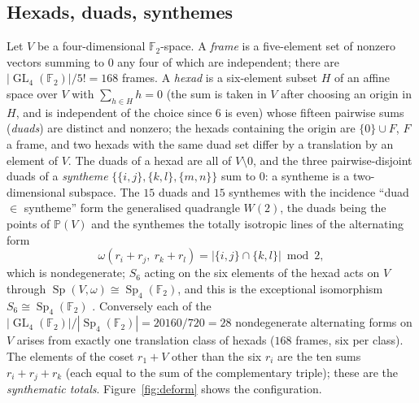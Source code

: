 ﻿\documentclass[12pt,a4paper]{amsart}
\theoremstyle{definition}
\newcommand{\F}{\mathbb{F}}
\newcommand{\Sp}{\operatorname{Sp}}
\newcommand{\GL}{\operatorname{GL}}
\begin{document}
\subsection{Hexads, duads, synthemes}\label{subsec:hexads}
Let $V$ be a four-dimensional $\F_2$-space. A \emph{frame} is a five-element set of nonzero vectors summing to $0$ any four of which are independent; there are $|\GL_4(\F_2)|/5!=168$ frames. A \emph{hexad} is a six-element subset $H$ of an affine space over $V$ with $\sum_{h\in H}h=0$ (the sum is taken in $V$ after choosing an origin in $H$, and is independent of the choice since $6$ is even) whose fifteen pairwise sums (\emph{duads}) are distinct and nonzero; the hexads containing the origin are $\{0\}\cup F$, $F$ a frame, and two hexads with the same duad set differ by a translation by an element of $V$. The duads of a hexad are all of $V\setminus0$, and the three pairwise-disjoint duads of a \emph{syntheme} $\{\{i,j\},\{k,l\},\{m,n\}\}$ sum to $0$: a syntheme is a two-dimensional subspace. The $15$ duads and $15$ synthemes with the incidence ``duad $\in$ syntheme'' form the generalised quadrangle $W(2)$, the duads being the points of $\mathbb P(V)$ and the synthemes the totally isotropic lines of the alternating form
\begin{equation}\label{eq:omega}
\omega(r_i+r_j,\ r_k+r_l)=|\{i,j\}\cap\{k,l\}|\bmod2 ,
\end{equation}
which is nondegenerate; $S_6$ acting on the six elements of the hexad acts on $V$ through $\Sp(V,\omega)\cong\Sp_4(\F_2)$, and this is the exceptional isomorphism $S_6\cong\Sp_4(\F_2)$ \cite{Conway}. Conversely each of the $|\GL_4(\F_2)|/|\Sp_4(\F_2)|=20160/720=28$ nondegenerate alternating forms on $V$ arises from exactly one translation class of hexads ($168$ frames, six per class). The elements of the coset $r_1+V$ other than the six $r_i$ are the ten sums $r_i+r_j+r_k$ (each equal to the sum of the complementary triple); these are the \emph{synthematic totals}. Figure~\ref{fig:deform} shows the configuration.
\end{document}
